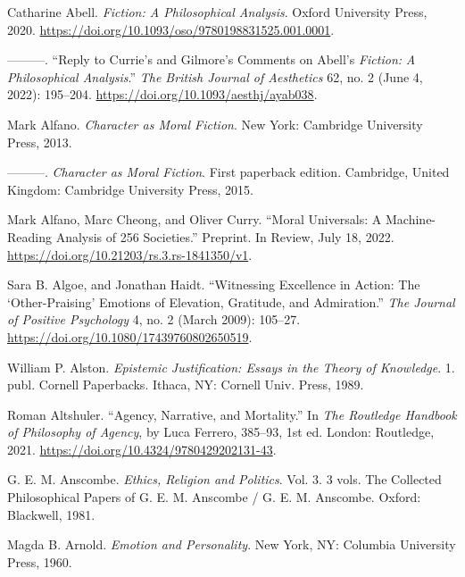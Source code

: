 \documentclass[phdthesis,12pt,final,a4paper]{wuthesis}
\newlength{\cslhangindent}
\newenvironment{CSLReferences}[2] %
{\begin{list}{}{%
	\setlength{\itemindent}{0pt}
	\setlength{\leftmargin}{0pt}
	\setlength{\parsep}{0pt}
	\ifodd #1
	\setlength{\leftmargin}{\cslhangindent}
	\setlength{\itemindent}{-1\cslhangindent}
	\fi
	\setlength{\itemsep}{#2\baselineskip}}}
{\end{list}}
\theoremstyle{definition}
\theoremstyle{definition}
\theoremstyle{definition}
\theoremstyle{definition}
\theoremstyle{remark}
\begin{document}
\label{refs}
\begin{CSLReferences}{1}{0}
Catharine Abell. \emph{Fiction: {A Philosophical Analysis}}. Oxford University Press, 2020. \url{https://doi.org/10.1093/oso/9780198831525.001.0001}.

---------. {``Reply to {Currie}'s and {Gilmore}'s Comments on {Abell}'s {\emph{Fiction}}{\emph{:} }{\emph{A Philosophical Analysis}}.''} \emph{The British Journal of Aesthetics} 62, no. 2 (June 4, 2022): 195--204. \url{https://doi.org/10.1093/aesthj/ayab038}.

Mark Alfano. \emph{Character as Moral Fiction}. New York: Cambridge University Press, 2013.

---------. \emph{Character as Moral Fiction}. First paperback edition. Cambridge, United Kingdom: Cambridge University Press, 2015.

Mark Alfano, Marc Cheong, and Oliver Curry. {``Moral {Universals}: {A} Machine-Reading Analysis of 256 Societies.''} Preprint. In Review, July 18, 2022. \url{https://doi.org/10.21203/rs.3.rs-1841350/v1}.

Sara B. Algoe, and Jonathan Haidt. {``Witnessing Excellence in Action: The {`Other-Praising'} Emotions of Elevation, Gratitude, and Admiration.''} \emph{The Journal of Positive Psychology} 4, no. 2 (March 2009): 105--27. \url{https://doi.org/10.1080/17439760802650519}.

William P. Alston. \emph{Epistemic Justification: Essays in the Theory of Knowledge}. 1. publ. Cornell Paperbacks. Ithaca, NY: Cornell Univ. Press, 1989.

Roman Altshuler. {``Agency, Narrative, and Mortality.''} In \emph{The {Routledge Handbook} of {Philosophy} of {Agency}}, by Luca Ferrero, 385--93, 1st ed. London: Routledge, 2021. \url{https://doi.org/10.4324/9780429202131-43}.

G. E. M. Anscombe. \emph{Ethics, Religion and Politics}. Vol. 3. 3 vols. The Collected Philosophical Papers of {G}. {E}. {M}. {Anscombe} / {G}. {E}. {M}. {Anscombe}. Oxford: Blackwell, 1981.

Magda B. Arnold. \emph{Emotion and {Personality}}. New York, NY: Columbia University Press, 1960.


\end{CSLReferences}
\end{document}
